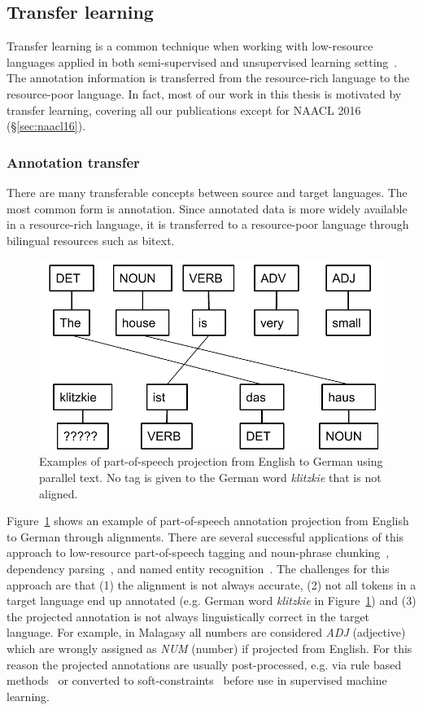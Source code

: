 \documentclass[12pt,twoside,final,hidelinks]{ltthesis}
\theoremstyle{definition}
\newcommand\naaclvi{NAACL 2016 (\S\ref{sec:naacl16})}
\begin{document}
\subsection{Transfer learning}
Transfer learning is a common technique when working with low-resource 
languages applied in both semi-supervised and unsupervised learning setting~\cite{TackstromDPMN13,Das:2011,YarowskyAndNgai,duongIJCNLP,Hwa:2005:BPV,P14-1126}. The annotation information is transferred from the resource-rich language to the resource-poor language. In fact, most of our work in this thesis is motivated by transfer learning, covering all our publications except for \naaclvi. 
\subsubsection{Annotation transfer}
There are many transferable concepts between source and target languages. The most common 
form is annotation. Since annotated data is more widely available in a resource-rich language, it is transferred to a resource-poor language through bilingual resources such as bitext.
\begin{figure}
\centering
\includegraphics[scale=0.5]{Figures/LabelProjection}
\caption[Part-of-speech projection examples]{Examples of part-of-speech projection from English to German using parallel text. No tag is given to the German word \textit{klitzkie} that is not aligned.}
\label{fig:projection_example_en_de}
\end{figure}
Figure~\ref{fig:projection_example_en_de} shows an example of part-of-speech annotation projection from English to German through alignments. 
There are several successful applications of this approach to low-resource part-of-speech tagging and noun-phrase chunking~\cite{YarowskyAndNgai}, dependency parsing~\cite{Hwa:2005:BPV}, and named entity recognition~\cite{wang-che-manning:2013:ACL2013}.
The challenges for this approach are that (1) the alignment is not always accurate, (2) not all 
tokens in a target language end up annotated (e.g. German word \textit{klitzkie} in Figure~\ref{fig:projection_example_en_de}) and (3) 
the projected annotation is not always linguistically correct in the target language. For 
example, in Malagasy all numbers are considered \textit{ADJ} (adjective) which are wrongly assigned as \textit{NUM} (number) if projected from English. 
For this reason the projected annotations are usually post-processed, e.g. via rule based methods~\cite{Hwa:2005:BPV} or converted to soft-constraints~\cite{Das:2011,TackstromDPMN13} before use in supervised machine learning. 
\end{document}
